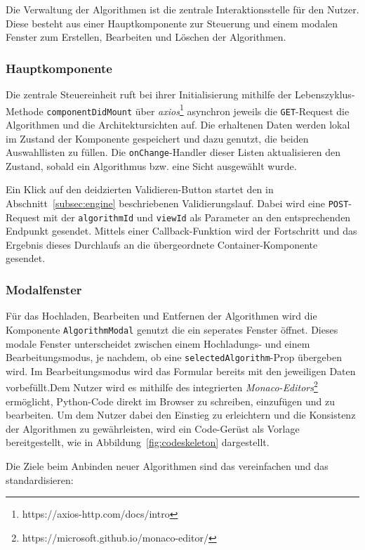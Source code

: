 Die Verwaltung der Algorithmen ist die zentrale Interaktionsstelle für den Nutzer. Diese besteht aus einer Hauptkomponente zur Steuerung und einem modalen Fenster zum Erstellen, Bearbeiten und Löschen der Algorithmen.

\subsubsection*{Hauptkomponente}

Die zentrale Steuereinheit ruft bei ihrer Initialisierung mithilfe der Lebenszyklus-Methode \texttt{componentDidMount} über \textit{axios}\footnote{https://axios-http.com/docs/intro} asynchron jeweils die \texttt{GET}-Request die Algorithmen und die Architektursichten auf. Die erhaltenen Daten werden lokal im Zustand der Komponente gespeichert und dazu genutzt, die beiden Auswahllisten zu füllen. Die \texttt{onChange}-Handler dieser Listen aktualisieren den Zustand, sobald ein Algorithmus bzw. eine Sicht ausgewählt wurde.

Ein Klick auf den deidzierten \glqq Validieren\grqq{}-Button startet den in Abschnitt~\ref{subsec:engine} beschriebenen Validierungslauf. Dabei wird eine \texttt{POST}-Request mit der \texttt{algorithmId} und \texttt{viewId} als Parameter an den entsprechenden Endpunkt gesendet. Mittels einer Callback-Funktion wird der Fortschritt und das Ergebnis dieses Durchlaufs an die übergeordnete Container-Komponente gesendet.

\subsubsection*{Modalfenster}

Für das Hochladen, Bearbeiten und Entfernen der Algorithmen wird die Komponente \texttt{AlgorithmModal} genutzt die ein seperates Fenster öffnet. Dieses modale Fenster unterscheidet zwischen einem Hochladungs- und einem Bearbeitungsmodus, je nachdem, ob eine \texttt{selectedAlgorithm}-Prop übergeben wird. Im Bearbeitungsmodus wird das Formular bereits mit den jeweiligen Daten vorbefüllt.Dem Nutzer wird es mithilfe des integrierten \textit{Monaco-Editors}\footnote{https://microsoft.github.io/monaco-editor/} ermöglicht, Python-Code direkt im Browser zu schreiben, einzufügen und zu bearbeiten. Um dem Nutzer dabei den Einstieg zu erleichtern und die Konsistenz der Algorithmen zu gewährleisten, wird ein Code-Gerüst als Vorlage bereitgestellt, wie in Abbildung~\ref{fig:codeskeleton} dargestellt.

Die Ziele beim Anbinden neuer Algorithmen sind das vereinfachen und das standardisieren:

